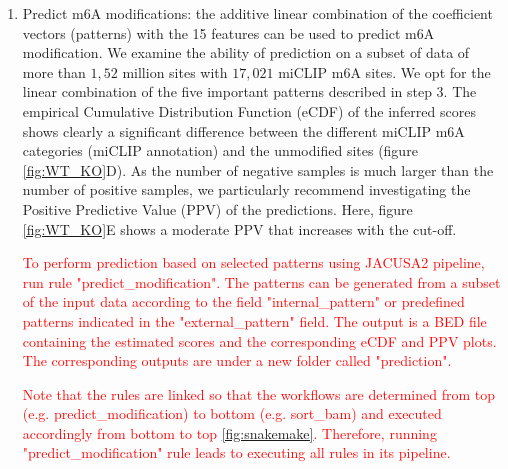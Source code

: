 \documentclass[times, 11pt, a4paper]{article}
\begin{document}
\begin{enumerate}
	
	\begin{spverbatim} 
	$ srun snakemake --cores all get_pattern 	
	\end{spverbatim} 
	\textcolor{red}{The produced patterns and their combinations can be visualized using "visualize\_pattern" rule. The corresponding outputs are under "pattern/viz" folder.}
	\begin{spverbatim} 
$ srun snakemake --cores all visualize_pattern 	
\end{spverbatim} 
	
\item Predict m6A modifications: the additive linear combination of the coefficient vectors (patterns) with the 15 features can be used to predict m6A modification. We examine the ability of prediction on a subset of data of more than $1,52$ million sites with $17,021$ miCLIP m6A sites. We opt for the linear combination of the five important patterns described in step 3. The empirical Cumulative Distribution Function (eCDF) of the inferred scores shows clearly a significant difference between the different miCLIP m6A categories (miCLIP annotation) and the unmodified sites (figure \ref{fig:WT_KO}D). As the number of negative samples is much larger than the number of positive samples, we particularly recommend investigating the Positive Predictive Value (PPV) of the predictions. Here, figure \ref{fig:WT_KO}E shows a moderate PPV that increases with the cut-off.  

\textcolor{red}{To perform prediction based on selected patterns using JACUSA2 pipeline, run rule "predict\_modification". The patterns can be generated from a subset of the input data according to the field "internal\_pattern" or predefined patterns indicated in the "external\_pattern" field. The output is a BED file containing the estimated scores and the corresponding eCDF and PPV plots. The corresponding outputs are under a new folder called "prediction". }

		
\textcolor{red}{Note that the rules are linked so that the workflows are determined from top (e.g. predict\_modification) to bottom (e.g. sort\_bam) and executed accordingly from bottom to top \ref{fig:snakemake}. Therefore, running "predict\_modification" rule leads to executing all rules in its pipeline. }
 
	
\end{enumerate}
\end{document}

